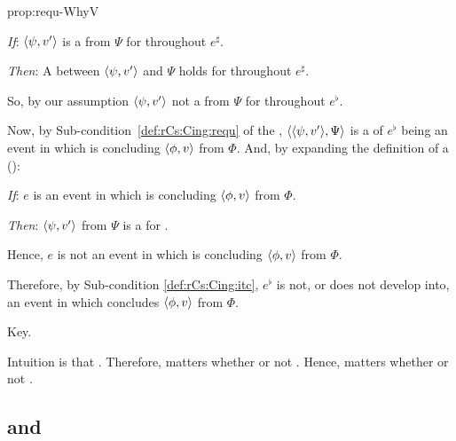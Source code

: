 \begin{note}
\begin{argument}{prop:requ-WhyV}
    \begin{itenum}
    \item[\emph{If}:]
      \(\langle \psi, v' \rangle\) is a  from \(\Psi\) for \vAgent{} throughout \(e^{\sharp}\).
    \item[\emph{Then}:]
      A  between \(\langle \psi, v' \rangle\) and \(\Psi\) holds for \vAgent{} throughout \(e^{\sharp}\).
    \end{itenum}

    \noindent%
    So, by our assumption \(\langle \psi, v' \rangle\) not a  from \(\Psi\) for \vAgent{} throughout \(e^{\flat}\).

    Now, by Sub-condition~\ref{def:rCs:Cing:requ} of the \rCon{}, \(\langle \langle \psi, v' \rangle, \Psi \rangle\) is a \requ{} of \(e^{\flat}\) being an event in which \vAgent{} is concluding \(\langle \phi, v \rangle\) from \(\Phi\).
    And, by expanding the definition of a \requ{} ():

    \begin{itenum}
    \item[\emph{If}:]
      \(e\) is an event in which \vAgent{} is concluding \(\langle \phi, v \rangle\) from \(\Phi\).
    \item[\emph{Then}:]
      \(\langle \psi, v' \rangle\) from \(\Psi\) is a \fc{} for \vAgent{}.
    \end{itenum}

    \noindent%
    Hence, \(e\) is not an event in which \vAgent{} is concluding \(\langle \phi, v \rangle\) from \(\Phi\).

    Therefore, by Sub-condition \ref{def:rCs:Cing:itc}, \(e^{\flat}\) is not, or does not develop into, an event in which \vAgent{} concludes \(\langle \phi, v \rangle\) from \(\Phi\).
  \end{argument}
\end{note}

\begin{note}
  Key.

  Intuition is that \tC{}.
  Therefore, matters whether or not \fc{}.
  Hence, matters whether or not \ros{}.
\end{note}

\subsection{ and \issueConstraint{}}
\label{cha:binding:sec:requ-iC}

